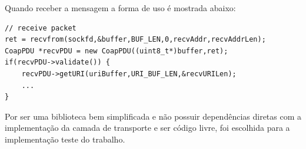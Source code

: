 Quando receber a mensagem a forma de uso \'e mostrada abaixo:
\begin{lstlisting}
// receive packet
ret = recvfrom(sockfd,&buffer,BUF_LEN,0,recvAddr,recvAddrLen);
CoapPDU *recvPDU = new CoapPDU((uint8_t*)buffer,ret);
if(recvPDU->validate()) {
    recvPDU->getURI(uriBuffer,URI_BUF_LEN,&recvURILen);
    ...
}
\end{lstlisting}

Por ser uma biblioteca bem simplificada e n\~ao possuir depend\^encias diretas com a implementa\c{c}\~ao da camada de transporte e ser c\'odigo livre, foi escolhida para a implementa\c{c}\~ao teste do trabalho.
